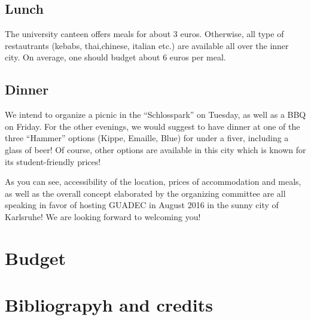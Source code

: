 \subsection{Lunch}
The university canteen offers meals for about 3 euros. Otherwise, all type of restautrants (kebabs, thai,chinese, italian etc.) are available all over the inner city. On average, one should budget about 6 euros per meal.


\subsection{Dinner}
We intend to organize a picnic in the “Schlosspark” on Tuesday, as well as a BBQ on Friday. For the other evenings, we would suggest to have dinner at one of the three “Hammer” options (Kippe, Emaille, Blue) for under a fiver, including a glass of beer! Of course, other options are available in this city which is known for its student-friendly prices!


As you can see, accessibility of the location, prices of accommodation and meals, as well as the overall concept elaborated by the organizing committee are all speaking in favor of hosting GUADEC in August 2016 in the sunny city of Karlsruhe! We are looking forward to welcoming you!

\section{Budget}
\section{Bibliograpyh and credits}